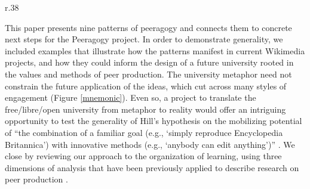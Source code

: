 



\begin{wrapfigure}{r}{.38\textwidth}
\vspace{-2cm}
\resizebox{.37\textwidth}{!}{

}
\vspace{-1.8cm}
\captionsetup{font=footnotesize,width=.45\textwidth}
\caption{Mnemonic \label{mnemonic}}
\vspace{-.5cm}
\end{wrapfigure}

This paper presents nine patterns of peeragogy and connects them to
concrete next steps for the Peeragogy project.  In order to
demonstrate generality, we included examples that illustrate how the
patterns manifest in current Wikimedia projects, and how they could
inform the design of a future university rooted in the values and
methods of peer production.
%
The university metaphor need not constrain the future application of
the ideas, which cut across many styles of engagement (Figure \ref{mnemonic}).
Even so, a project to translate the free\slash libre\slash open
university from metaphor to reality would offer an intriguing
opportunity to test the generality of Hill's hypothesis on the
mobilizing potential of ``the combination of a familiar goal (e.g.,
`simply reproduce Encyclopedia Britannica') with innovative methods
(e.g., `anybody can edit anything')'' \cite[p.~13]{mako-thesis}.  We
close by reviewing our approach to the organization of learning, using
three dimensions of analysis that have been previously applied to
describe research on peer production \cite{benkler2015peer}.

